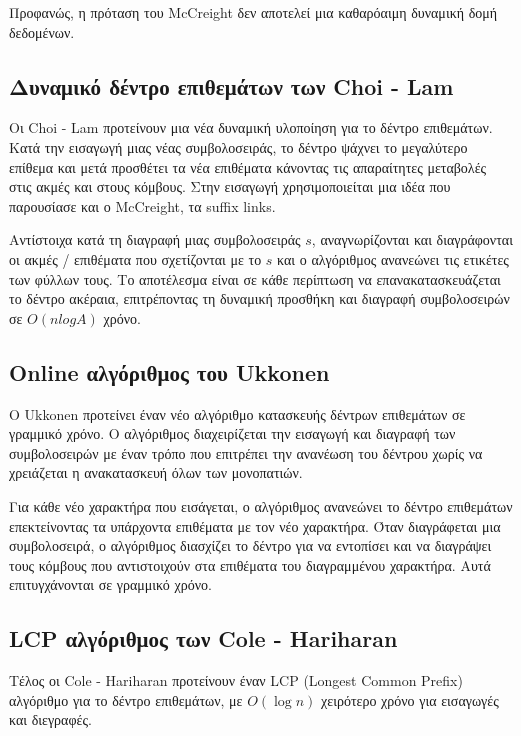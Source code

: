             Προφανώς, η πρόταση του McCreight δεν αποτελεί μια καθαρόαιμη δυναμική δομή δεδομένων.

        \subsection{Δυναμικό δέντρο επιθεμάτων των Choi - Lam}
            Οι Choi - Lam προτείνουν μια νέα δυναμική υλοποίηση για το δέντρο επιθεμάτων. \cite{Choi_Lam_1997}
            Κατά την εισαγωγή μιας νέας συμβολοσειράς, το δέντρο ψάχνει το μεγαλύτερο επίθεμα και μετά προσθέτει τα νέα επιθέματα κάνοντας τις απαραίτητες μεταβολές στις ακμές και στους κόμβους.
            Στην εισαγωγή χρησιμοποιείται μια ιδέα που παρουσίασε και ο McCreight, τα suffix links.

            Αντίστοιχα κατά τη διαγραφή μιας συμβολοσειράς \(s\), αναγνωρίζονται και διαγράφονται οι ακμές / επιθέματα που σχετίζονται με το \(s\) και ο αλγόριθμος ανανεώνει τις ετικέτες των φύλλων τους.
            Το αποτέλεσμα είναι σε κάθε περίπτωση να επανακατασκευάζεται το δέντρο ακέραια, επιτρέποντας τη δυναμική προσθήκη και διαγραφή συμβολοσειρών σε \(O(nlogA)\) χρόνο.

        \subsection{Online αλγόριθμος του Ukkonen}
            O Ukkonen προτείνει έναν νέο αλγόριθμο κατασκευής δέντρων επιθεμάτων σε γραμμικό χρόνο. \cite{Ukkonen_1995}
            Ο αλγόριθμος διαχειρίζεται την εισαγωγή και διαγραφή των συμβολοσειρών με έναν τρόπο που επιτρέπει την ανανέωση του δέντρου χωρίς να χρειάζεται η ανακατασκευή όλων των μονοπατιών.

            Για κάθε νέο χαρακτήρα που εισάγεται, ο αλγόριθμος ανανεώνει το δέντρο επιθεμάτων επεκτείνοντας τα υπάρχοντα επιθέματα με τον νέο χαρακτήρα.
            Όταν διαγράφεται μια συμβολοσειρά, ο αλγόριθμος διασχίζει το δέντρο για να εντοπίσει και να διαγράψει τους κόμβους που αντιστοιχούν στα επιθέματα του διαγραμμένου χαρακτήρα.
            Αυτά επιτυγχάνονται σε γραμμικό χρόνο.

        \subsection{LCP αλγόριθμος των Cole - Hariharan}
            Τέλος οι Cole - Hariharan προτείνουν έναν LCP (Longest Common Prefix) αλγόριθμο για το δέντρο επιθεμάτων, με \(O(\log n)\) χειρότερο χρόνο για εισαγωγές και διεγραφές. \cite{Cole_Hariharan_2005}

